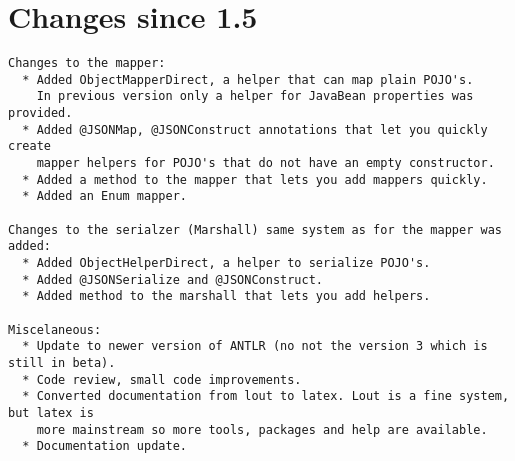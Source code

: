 \documentclass[a4paper]{article}
\begin{document}
\section{Changes since 1.5}
\begin{verbatim}
Changes to the mapper:
  * Added ObjectMapperDirect, a helper that can map plain POJO's. 
    In previous version only a helper for JavaBean properties was provided.
  * Added @JSONMap, @JSONConstruct annotations that let you quickly create 
    mapper helpers for POJO's that do not have an empty constructor.
  * Added a method to the mapper that lets you add mappers quickly.
  * Added an Enum mapper.

Changes to the serialzer (Marshall) same system as for the mapper was added:
  * Added ObjectHelperDirect, a helper to serialize POJO's. 
  * Added @JSONSerialize and @JSONConstruct.
  * Added method to the marshall that lets you add helpers.

Miscelaneous:
  * Update to newer version of ANTLR (no not the version 3 which is still in beta).
  * Code review, small code improvements.
  * Converted documentation from lout to latex. Lout is a fine system, but latex is
    more mainstream so more tools, packages and help are available.
  * Documentation update.
\end{verbatim}
 
\end{document}
